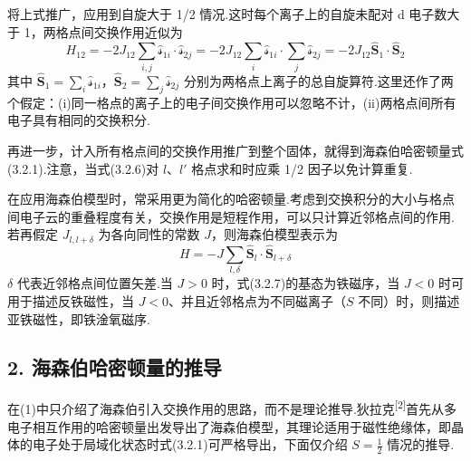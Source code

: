 将上式推广，应用到自旋大于 1/2 情况.这时每个离子上的自旋未配对 d 电子数大于 1，两格点间交换作用近似为
\begin{equation}
  H_{12}=-2J_{12}\sum_{i,j}\hat{\mathcal{s}}_{1i}\cdot\hat{\mathcal{s}}_{2j}
  =-2J_{12}\sum_i\hat{\mathcal{s}}_{1i}\cdot\sum_j\hat{\mathcal{s}}_{2j}
  =-2J_{12}\hat{\boldsymbol{S}}_1\cdot\hat{\boldsymbol{S}}_2
\end{equation}
其中 $\hat{\boldsymbol{S}}_1=\sum_i\hat{\mathcal{s}}_{1i}$，$\hat{\boldsymbol{S}}_2=\sum_j\hat{\mathcal{s}}_{2j}$ 分别为两格点上离子的总自旋算符.这里还作了两个假定：(i)同一格点的离子上的电子间交换作用可以忽略不计，(ii)两格点间所有电子具有相同的交换积分.

再进一步，计入所有格点间的交换作用推广到整个固体，就得到海森伯哈密顿量式(3.2.1).注意，当式(3.2.6)对 $l$、$l'$ 格点求和时应乘 1/2 因子以免计算重复.

在应用海森伯模型时，常采用更为简化的哈密顿量.考虑到交换积分的大小与格点间电子云的重叠程度有关，交换作用是短程作用，可以只计算近邻格点间的作用.若再假定 $J_{l,l+\delta}$ 为各向同性的常数 $J$，则海森伯模型表示为
\begin{equation}
  H=-J\sum_{l,\delta}\hat{\boldsymbol{S}}_l\cdot\hat{\boldsymbol{S}}_{l+\delta}
\end{equation}
$\delta$ 代表近邻格点间位置矢差.当 $J>0$ 时，式(3.2.7)的基态为铁磁序，当 $J<0$ 时可用于描述反铁磁性，当 $J<0$、并且近邻格点为不同磁离子（$S$ 不同）时，则描述亚铁磁性，即铁淦氧磁序.

\subsection*{2. 海森伯哈密顿量的推导}

在(1)中只介绍了海森伯引入交换作用的思路，而不是理论推导.狄拉克\textsuperscript{[2]}首先从多电子相互作用的哈密顿量出发导出了海森伯模型，其理论适用于磁性绝缘体，即晶体的电子处于局域化状态时式(3.2.1)可严格导出，下面仅介绍 $S=\frac{1}{2}$ 情况的推导.

